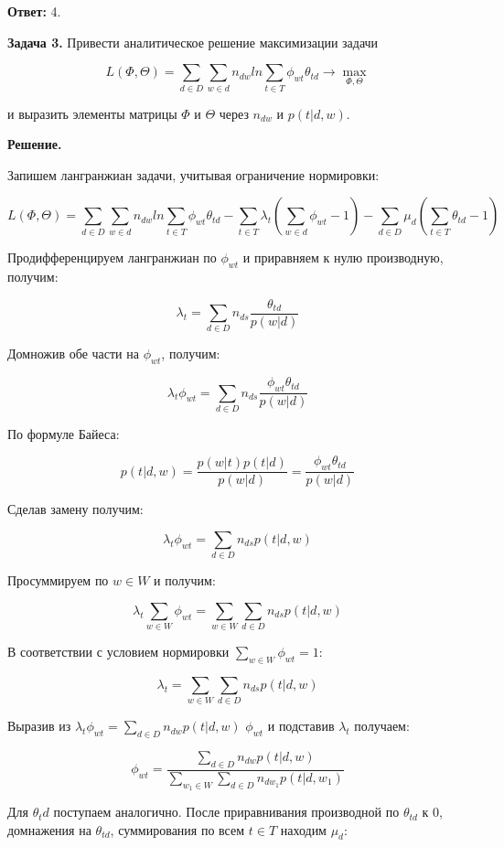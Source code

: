 \textbf{Ответ:} 4.

\textbf{Задача 3.} Привести аналитическое решение максимизации задачи

$$L(\Phi, \Theta) = \sum_{d \in D} \sum_{w \in d} n_{dw} ln \sum_{t \in T} \phi_{wt} \theta_{td} \rightarrow \max_{\Phi, \Theta}$$

и выразить элементы матрицы $\Phi$ и $\Theta$ через $n_{dw}$ и $p(t|d,w)$.

\textbf{Решение.}

Запишем лангранжиан задачи, учитывая ограничение нормировки:

$$L(\Phi, \Theta) = \sum_{d \in D} \sum_{w \in d} n_{dw} ln \sum_{t \in T} \phi_{wt} \theta_{td} - \sum_{t \in T} \lambda_{t} (\sum_{w \in d} \phi_{wt} - 1) - \sum_{d \in D} \mu_{d} (\sum_{t \in T} \theta_{td} - 1)$$

Продифференцируем лангранжиан по $\phi_{wt}$ и приравняем к нулю производную, получим:

$$\lambda_{t} = \sum_{d \in D} n_{ds} \frac{\theta_{td}}{p(w|d)}$$

Домножив обе части на $\phi_{wt}$, получим:

$$\lambda_{t} \phi_{wt} = \sum_{d \in D} n_{ds} \frac{\phi_{wt} \theta_{td}}{p(w|d)}$$

По формуле Байеса:

$$p(t|d,w) = \frac{p(w|t) p(t|d)}{p(w|d)} = \frac{\phi_{wt} \theta_{td}}{p(w|d)}$$

Сделав замену  получим:

$$\lambda_{t} \phi_{wt} = \sum_{d \in D} n_{ds} p(t|d,w)$$

Просуммируем по $w \in W$ и получим:

$$\lambda_{t} \sum_{w \in W} \phi_{wt} = \sum_{w \in W} \sum_{d \in D} n_{ds} p(t|d,w)$$

В соответствии с условием нормировки $\sum_{w \in W} \phi_{wt} = 1$:

$$\lambda_{t} = \sum_{w \in W} \sum_{d \in D} n_{ds} p(t|d,w)$$

Выразив из $\lambda_t \phi_{wt} = \sum_{d \in D} n_{dw} p(t|d,w)$ $\phi_{wt}$ и подставив $\lambda_{t}$ получаем:

$$\phi_{wt} = \frac{\sum_{d \in D} n_{dw} p(t|d,w)}{\sum_{w_{1} \in W} \sum_{d \in D} n_{dw_{1}} p(t|d,w_{1})}$$

Для $\theta_td$ поступаем аналогично. После приравнивания производной по $\theta_{td}$ к $0$, домнажения на $\theta_{td}$, суммирования по всем $t \in T$ находим $\mu_{d}$:

